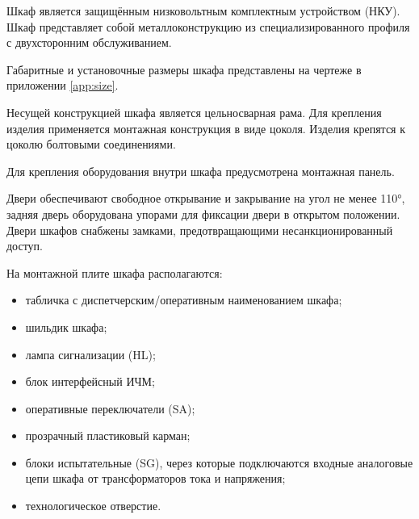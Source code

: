 \begin{enumsubsub}
\item Шкаф является защищённым низковольтным комплектным устройством (НКУ). Шкаф представляет собой металлоконструкцию из специализированного профиля с двухсторонним обслуживанием.
%
\item Габаритные и установочные размеры шкафа представлены на чертеже в приложении \ref{app:size}.
\item Несущей конструкцией шкафа является цельносварная рама. Для крепления изделия применяется монтажная конструкция в виде цоколя. Изделия крепятся к цоколю болтовыми соединениями.
\item Для крепления оборудования внутри шкафа предусмотрена монтажная панель.
%
\item Двери обеспечивают свободное открывание и закрывание на угол не менее 110°, задняя дверь оборудована упорами для фиксации двери в открытом положении. Двери шкафов снабжены замками, предотвращающими несанкционированный доступ.
\item На монтажной плите шкафа располагаются:
  \begin{itemize}
  \item табличка с диспетчерским/оперативным наименованием шкафа;
  \item шильдик шкафа;
  \item лампа сигнализации (HL);
  \item блок интерфейсный ИЧМ;
  \item оперативные переключатели (SA);
  \item прозрачный пластиковый карман;
  \item блоки испытательные (SG), через которые подключаются входные аналоговые цепи шкафа от трансформаторов тока и напряжения;
  \item технологическое отверстие.
  \end{itemize}

\end{enumsubsub}
